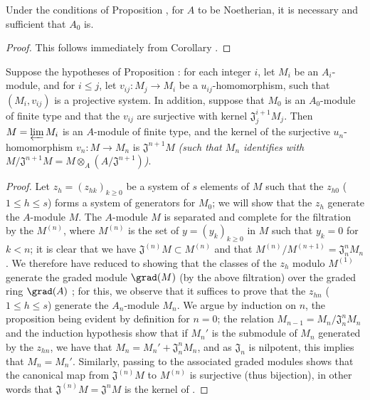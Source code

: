 \begin{corollary}[7.2.8]
\label{0.7.2.8}
Under the conditions of Proposition , for $A$ to
be Noetherian, it is necessary and sufficient that $A_0$ is.
\end{corollary}

\begin{proof}
This follows immediately from Corollary .
\end{proof}

\begin{proposition}[7.2.9]
\label{0.7.2.9}
Suppose the hypotheses of Proposition : for each integer $i$,
let $M_i$ be an $A_i$-module, and for $i\leq j$, let $v_{ij}:M_j\to M_i$ be a
$u_{ij}$-homomorphism, such that $(M_i,v_{ij})$ is a projective system. In addition, suppose
that $M_0$ is an $A_0$-module of finite type and that the $v_{ij}$ are surjective with kernel
$\mathfrak{J}_j^{i+1}M_j$. Then $M=\varprojlim M_i$ is an $A$-module of finite type, and the
kernel of the surjective $u_n$-homomorphism $v_n:M\to M_n$ is $\mathfrak{J}^{n+1}M$
\emph{(such that $M_n$ identifies with
$M/\mathfrak{J}^{n+1}M=M\otimes_A(A/\mathfrak{J}^{n+1})$)}.
\end{proposition}

\begin{proof}
Let $z_h=(z_{hk})_{k\geq 0}$ be a system of $s$ elements of $M$ such that the $z_{h0}$
($1\leq h\leq s$) forms a system of generators for $M_0$; we will show that the
$z_h$ generate the $A$-module $M$. The $A$-module $M$ is separated and complete for the
filtration by the $M^{(n)}$, where $M^{(n)}$ is the set of $y=(y_k)_{k\geq 0}$ in $M$
such that $y_k=0$ for $k<n$; it is clear that we have $\mathfrak{J}^{(n)}M\subset M^{(n)}$
and that $M^{(n)}/M^{(n+1)}=\mathfrak{J}_n^n M_n$. We therefore have reduced to showing that
the classes of the $z_h$ modulo $M^{(1)}$ generate the graded module $\grad(M)$ (by the
above filtration) over the graded ring $\grad(A)$ \cite[p.~18--06, lemme]{I-1}; for this, we
observe that it suffices to prove that the $z_{hn}$ ($1\leq h\leq s$) generate the
$A_n$-module $M_n$. We argue by induction on $n$, the proposition being evident by definition
for $n=0$; the relation $M_{n-1}=M_n/\mathfrak{J}_n^n M_n$ and the induction hypothesis show
that if $M_n'$ is the submodule of $M_n$ generated by the $z_{hn}$, we have that
$M_n=M_n'+\mathfrak{J}_n^n M_n$, and as $\mathfrak{J}_n$ is nilpotent, this implies that
$M_n=M_n'$. Similarly, passing to the associated graded modules shows that the canonical map
from $\mathfrak{J}^{(n)}M$ to $M^{(n)}$ is surjective (thus bijection), in other words that
$\mathfrak{J}^{(n)}M=\mathfrak{J}^n M$ is the kernel of .
\end{proof}

